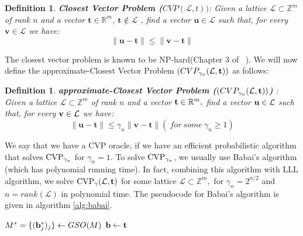 \documentclass{amsart}
\newtheorem{definition}[theorem]{Definition}
\numberwithin{equation}{section}
\def\L{\mathcal{L}}
\begin{document}
\begin{definition}
\textbf{Closest Vector Problem ($CVP(\L,t))$}:  Given a lattice $\mathcal{L}\subset {\mathbb{Z}}^m$ of rank $n$ and a vector $\textbf{t} \in {\mathbb{R}}^m$, $\textbf{t} \notin \L$ , find a vector $\textbf{u} \in \mathcal{L}$ such that, for every ${\textbf{v}} \in \mathcal{L}$ we have:
$$\| \textbf{u} - \textbf{t} \| \leq \| \textbf{v} - \textbf{t} \|$$
\end{definition}

The closest vector problem is known to be NP-hard(Chapter 3 of ~\cite{COMPLEXITY_OF_LATTICE_PROBLEMS}). We will now define the approximate-Closest Vector Problem $(CVP_{\gamma_{n}}({\mathcal{L}},{\bf t}))$ as follows:

\begin{definition}
\textbf{approximate-Closest Vector Problem ($(CVP_{\gamma_{n}}({\mathcal{L}},{\bf t}))$) }: Given a lattice $\mathcal{L}\subset {\mathbb{Z}}^m$ of rank $n$ and a vector ${\bf t}\in {\mathbb{R}}^m,$ find a vector ${\bf u}\in \mathcal{L}$ such that, for every ${\bf v}\in \mathcal{L}$ we have:
$$ \| \textbf{u} - \textbf{t} \| \leq \gamma_n \| \textbf{v} - \textbf{t} \| ( \ for \ some \ \gamma_n \geq 1)$$
\end{definition}

We say that we have a CVP oracle, if we have an efficient probabilistic algorithm that solves ${\rm CVP}_{\gamma_n}$ for $\gamma_n=1.$ To solve 
${\rm{CVP}}_{\gamma_n}$, we usually use Babai's algorithm \cite[Chapter 18]{gal} (which has polynomial running time). In fact, combining this algorithm with LLL algorithm, we solve ${\rm{CVP}}_{\gamma}(\mathcal{L},{\bf t})$ for some lattice $\mathcal{L}\subset {\mathbb{Z}}^m,$ for $\gamma_n = 2^{n/2}$ and $n=rank(\mathcal{L})$ in polynomial time. The pseudocode for Babai's algorithm is given in algorithm \ref{alg:babai}.
 
\begin{algorithm}[hbt!]
\caption{Babai's Nearest plane Algorithm}\label{alg:babai}

$M^{*} = \{({\bf b}_j^*)_j \}\leftarrow GSO(M)$ 
${\bf b} \gets {\bf t}$\;
\end{algorithm}
\end{document}
